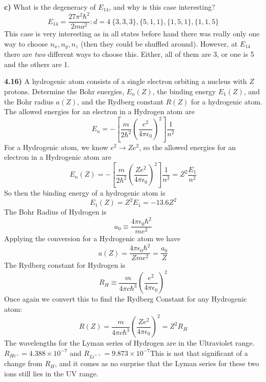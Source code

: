 \documentclass{scrartcl}
\begin{document}
\textbf{c)} What is the degeneracy of $E_{14}$, and why is this case interesting?
\begin{displaymath}
E_{14}=\frac{27\pi^2\hbar^2}{2ma^2} : d=4\ \{3,3,3\},\{5,1,1\},\{1,5,1\},\{1,1,5\}
\end{displaymath}
This case is very interesting as in all states before hand there was really only one way to choose $n_x,n_y,n_z$ (then they could be shuffled around). However, at $E_{14}$ there are \emph{two} different ways to choose this. Either, all of them are 3, or one is 5 and the others are 1.\pagebreak

\textbf{4.16)} A hydrogenic atom consists of a single electron orbiting a nucleus with $Z$ protons. Determine the Bohr energies, $E_n(Z)$, the binding energy $E_1(Z)$, and the Bohr radius $a(Z)$, and the Rydberg constant $R(Z)$ for a hydrogenic atom. \\

The allowed energies for an electron in a Hydrogen atom are
\begin{displaymath}
E_n=-\left[\frac{m}{2\hbar^2}\left(\frac{e^2}{4\pi\epsilon_0}\right)^2\right]\frac{1}{n^2}
\end{displaymath}
For a Hydrogenic atom, we know $e^2\rightarrow Ze^2$, so the allowed energies for an electron in a Hydrogenic atom are
\begin{displaymath}
E_n(Z)=-\left[\frac{m}{2\hbar^2}\left(\frac{Ze^2}{4\pi\epsilon_0}\right)^2\right]\frac{1}{n^2}=Z^2\frac{E_1}{n^2}
\end{displaymath}
So then the binding energy of a hydrogenic atom is
\begin{displaymath}
E_1(Z)=Z^2E_1=-13.6Z^2
\end{displaymath}
The Bohr Radius of Hydrogen is
\begin{displaymath}
a_0\equiv\frac{4\pi\epsilon_0\hbar^2}{me^2}
\end{displaymath}
Applying the conversion for a Hydrogenic atom we have
\begin{displaymath}
a(Z)=\frac{4\pi\epsilon_0\hbar^2}{Zme^2}=\frac{a_0}{Z}
\end{displaymath}
The Rydberg constant for Hydrogen is
\begin{displaymath}
R_H\equiv\frac{m}{4\pi c\hbar^3}\left(\frac{e^2}{4\pi\epsilon_0}\right)^2
\end{displaymath}
Once again we convert this to find the Rydberg Constant for any Hydrogenic atom:
\begin{displaymath}
R(Z)=\frac{m}{4\pi c\hbar^3}\left(\frac{Ze^2}{4\pi\epsilon_0}\right)^2=Z^2R_H
\end{displaymath}
The wavelengths for the Lyman series of Hydrogen are in the Ultraviolet range. $R_{He^+}=4.388\times10^{-7}$ and $R_{Li^{++}}=9.873\times10^{-7}$This is not that significant of a change from $R_H$, and it comes as no surprise that the Lyman series for these two ions still lies in the UV range.\pagebreak
\end{document}
